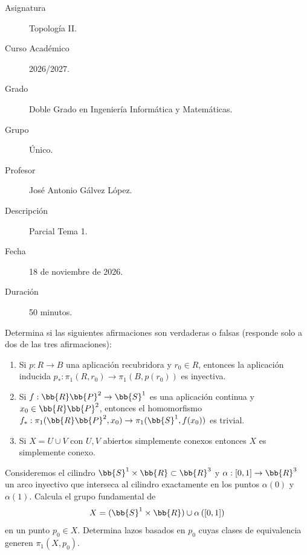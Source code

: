 \documentclass[12pt]{article}
\begin{document}

    
    

    \begin{description}
        \item[Asignatura] Topología II.
        \item[Curso Académico] 2026/2027.
        \item[Grado] Doble Grado en Ingeniería Informática y Matemáticas.
        \item[Grupo] Único.
        \item[Profesor] José Antonio Gálvez López.
        \item[Descripción] Parcial Tema 1.
        \item[Fecha] 18 de noviembre de 2026.
        \item[Duración] 50 minutos.
    \end{description}
    \newpage


    
    \begin{ejercicio}[5 puntos]
        Determina si las siguientes afirmaciones son verdaderas o falsas (responde solo a dos de las tres afirmaciones):
        \begin{enumerate}
            \item Si $p: R \to B$ una aplicación recubridora y $r_0 \in R$, entonces la aplicación inducida $p_*: \pi_1(R, r_0) \to \pi_1(B, p(r_0))$ es inyectiva.
            \item Si $f: \bb{R}\bb{P}^2 \to \bb{S}^1$ es una aplicación continua y $x_0 \in \bb{R}\bb{P}^2$, entonces el homomorfismo $f_*: \pi_1(\bb{R}\bb{P}^2, x_0) \to \pi_1(\bb{S}^1, f(x_0))$ es trivial.
            \item Si $X = U \cup V$ con $U, V$ abiertos simplemente conexos entonces $X$ es simplemente conexo.
        \end{enumerate}
    \end{ejercicio}

    \begin{ejercicio}[5 puntos]
        Consideremos el cilindro $\bb{S}^1 \times \bb{R} \subset \bb{R}^3$ y $\alpha: \left[0, 1\right] \to \bb{R}^3$ un arco inyectivo que interseca al cilindro exactamente en los puntos $\alpha(0)$ y $\alpha(1)$. Calcula el grupo fundamental de
        \[
            X = (\bb{S}^1 \times \bb{R}) \cup \alpha\left(\left[0, 1\right]\right)
        \]
        en un punto $p_0 \in X$. Determina lazos basados en $p_0$ cuyas clases de equivalencia generen $\pi_1(X, p_0)$.
    \end{ejercicio}
\end{document}

